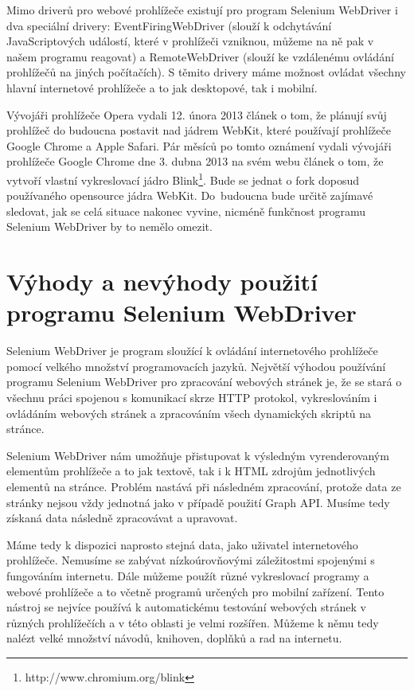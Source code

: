 \documentclass[thesis=M,czech]{FITthesis}[2013/05/10]
\begin{document}
Mimo driverů pro webové prohlížeče existují pro program Selenium WebDriver i dva speciální drivery: EventFiringWebDriver (slouží k odchytávání JavaScriptových událostí, které v prohlížeči vzniknou, můžeme na ně pak v našem programu reagovat) a RemoteWebDriver (slouží ke vzdálenému ovládání prohlížečů na jiných počítačích). S těmito drivery máme možnost ovládat všechny hlavní internetové prohlížeče a to jak desktopové, tak i mobilní.

Vývojáři prohlížeče Opera vydali 12. února 2013 
článek \cite{web:operaMovesToWebkit} o tom, že plánují svůj prohlížeč do budoucna postavit nad jádrem WebKit, které používají prohlížeče Google Chrome a Apple Safari. Pár měsíců po tomto oznámení vydali vývojáři prohlížeče Google Chrome dne 3. dubna 2013 na svém webu článek \cite{web:chromiumBlink} o tom, že vytvoří vlastní vykreslovací jádro Blink\footnote{http://www.chromium.org/blink}. Bude se jednat o fork doposud používaného opensource jádra WebKit. Do~budoucna bude určitě zajímavé sledovat, jak se celá situace nakonec vyvine, nicméně funkčnost programu Selenium WebDriver by to nemělo omezit.

\section{Výhody a nevýhody použití programu Selenium WebDriver}

Selenium WebDriver je program sloužící k ovládání internetového prohlížeče pomocí velkého množství programovacích jazyků. Největší výhodou používání programu Selenium WebDriver pro zpracování webových stránek je, že se stará o všechnu práci spojenou s komunikací skrze HTTP protokol, vykreslováním i ovládáním webových stránek a zpracováním všech dynamických skriptů na stránce. 

Selenium WebDriver nám umožňuje přistupovat k výsledným vyrenderovaným elementům prohlížeče a to jak textově, tak i k HTML zdrojům jednotlivých elementů na stránce. Problém nastává při následném zpracování, protože data ze stránky nejsou vždy jednotná jako v případě použití Graph API. Musíme tedy získaná data následně zpracovávat a upravovat.

Máme tedy k dispozici naprosto stejná data, jako uživatel internetového prohlížeče. Nemusíme se zabývat nízkoúrovňovými záležitostmi spojenými s fungováním internetu. Dále můžeme použít různé vykreslovací programy a webové prohlížeče a to včetně programů určených pro mobilní zařízení. Tento nástroj se nejvíce používá k automatickému testování webových stránek v různých prohlížečích a v této oblasti je velmi rozšířen. Můžeme k němu tedy nalézt velké množství návodů, knihoven, doplňků a rad na internetu. 
\end{document}
